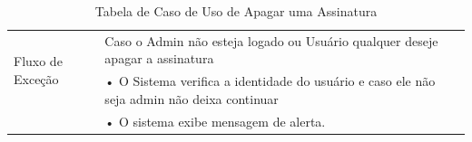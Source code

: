 \documentclass[a4paper,12pt]{article}
\begin{document}
\begin{table}[ht]
\begin{tabular}{|p{3.5cm}|p{10cm}|p{7cm}|}
        \multirow{2}{*}{Fluxo de Exceção}
                                           & Caso o Admin não esteja logado ou Usuário qualquer deseje apagar a assinatura                                                                                             \\
                                           & • O Sistema verifica a identidade do usuário e caso ele não seja admin não deixa continuar                                                                                \\
                                           & • O sistema exibe mensagem de alerta.                                                                                                                                     \\
        \hline
    \end{tabular}
    \caption{Tabela de Caso de Uso de Apagar uma Assinatura}
\end{table}
\end{document}
